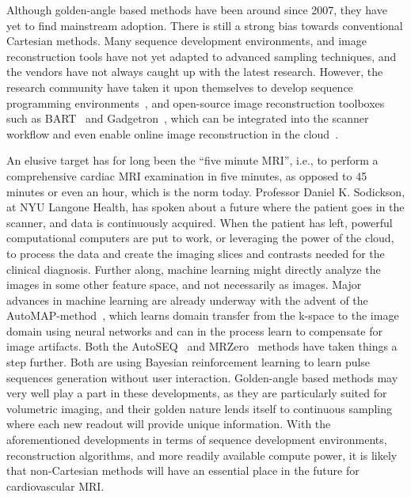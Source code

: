 Although golden-angle based methods have been around since 2007, they have yet to find mainstream adoption. There is still a strong bias towards conventional Cartesian methods. Many sequence development environments, and image reconstruction tools have not yet adapted to advanced sampling techniques, and the vendors have not always caught up with the latest research. However, the research community have taken it upon themselves to develop sequence programming environments~\cite{Layton2017,Skare2017:ISMRM}, and open-source image reconstruction toolboxes such as BART~\cite{Uecker2015:ISMRM} and Gadgetron~\cite{Hansen2013}, which can be integrated into the scanner workflow and even enable online image reconstruction in the cloud~\cite{Xue2015}.

An elusive target has for long been the ``five minute MRI'', i.e., to perform a comprehensive cardiac MRI examination in five minutes, as opposed to 45 minutes or even an hour, which is the norm today. Professor Daniel K. Sodickson, at NYU Langone Health, has spoken about a future where the patient goes in the scanner, and data is continuously acquired. When the patient has left, powerful computational computers are put to work, or leveraging the power of the cloud, to process the data and create the imaging slices and contrasts needed for the clinical diagnosis. Further along, machine learning might directly analyze the images in some other feature space, and not necessarily as images. Major advances in machine learning are already underway with the advent of the AutoMAP-method~\cite{Zhu2018}, which learns domain transfer from the k-space to the image domain using neural networks and can in the process learn to compensate for image artifacts. Both the AutoSEQ~\cite{Zhu2018:ISMRM} and MRZero~\cite{Loktyushin2020} methods have taken things a step further. Both are using Bayesian reinforcement learning to learn pulse sequences generation without user interaction. Golden-angle based methods may very well play a part in these developments, as they are particularly suited for volumetric imaging, and their golden nature lends itself to continuous sampling where each new readout will provide unique information. With the aforementioned developments in terms of sequence development environments, reconstruction algorithms, and more readily available compute power, it is likely that non-Cartesian methods will have an essential place in the future for cardiovascular MRI.